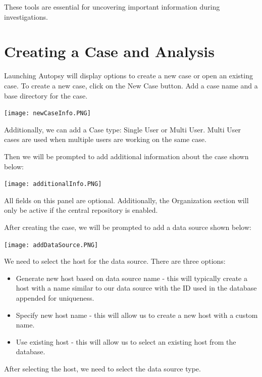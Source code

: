 \documentclass{extarticle}
\begin{document}
These tools are essential for uncovering important information during investigations.

\section{Creating a Case and Analysis}

Launching Autopsy will display options to create a new case or open an existing case. To create a new case, click on the New Case button. Add a case name and a base directory for the case.

\begin{center}
    \texttt{[image: newCaseInfo.PNG]}
\end{center}

Additionally, we can add a Case type: Single User or Multi User. Multi User cases are used when multiple users are working on the same case.

Then we will be prompted to add additional information about the case shown below:

\begin{center}
    \texttt{[image: additionalInfo.PNG]}
\end{center}

All fields on this panel are optional. Additionally, the Organization section will only be active if the central repository is enabled.

After creating the case, we will be prompted to add a data source shown below:

\begin{center}
    \texttt{[image: addDataSource.PNG]}
\end{center}

We need to select the host for the data source. There are three options:

\begin{itemize}
    \item Generate new host based on data source name - this will typically create a host with a name similar to our data source with the ID used in the database appended for uniqueness.
    \item Specify new host name - this will allow us to create a new host with a custom name.
    \item Use existing host - this will allow us to select an existing host from the database.
\end{itemize}

After selecting the host, we need to select the data source type.
\end{document}
